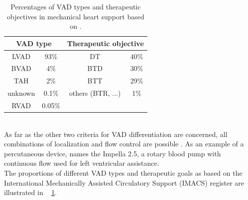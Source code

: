 \begin{table}[h]
  \centering
  \begin{tabular}{cc|cc}
    \toprule
    \multicolumn{2}{c|}{VAD type} &
    \multicolumn{2}{c}{Therapeutic objective} \\
    \midrule
    LVAD & 93\% & DT & 40\%\\
    BVAD & 4\% & BTD & 30\%\\
    TAH & 2\% & BTT & 29\%\\
    unknown & 0.1\% & others (BTR, ...) & 1\%\\
    RVAD & 0.05\% & &\\
    \bottomrule
\end{tabular}
  \caption[Distribution of VAD types and therapeutic objectives]{Percentages of VAD types and therapeutic objectives in mechanical heart support based on \cite{VAD7}.}
  \label{tab:Table2}
\end{table}
\\As far as the other two criteria for VAD differentiation are concerned, all combinations of localization and flow control are possible \cite{VAD10}. As an example of a percutaneous device, \cite{VAD7} names the Impella 2.5, a rotary blood pump with continuous flow used for left ventricular assistance.
\\The proportions of different VAD types and therapeutic goals as based on the International Mechanically Assisted Circulatory Support (IMACS) register are illustrated in \tablename~ \ref{tab:Table2}.
